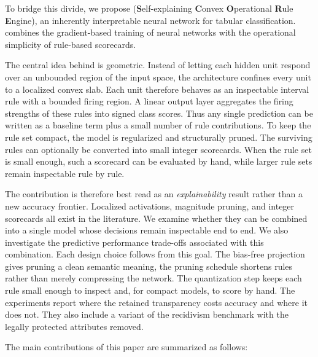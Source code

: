 To bridge this divide, we propose \modelname{} (\textbf{S}elf-explaining \textbf{C}onvex \textbf{O}perational \textbf{R}ule \textbf{E}ngine), an inherently interpretable neural network for tabular classification. \modelname{} combines the gradient-based training of neural networks with the operational simplicity of rule-based scorecards.


The central idea behind \modelname{} is geometric. Instead of letting each hidden
unit respond over an unbounded region of the input space, the architecture
confines every unit to a localized convex slab. Each unit therefore behaves as an
inspectable interval rule with a bounded firing region. A linear output layer
aggregates the firing strengths of these rules into signed class scores. Thus any
single prediction can be written as a baseline term plus a small number of rule
contributions. To keep the rule set compact, the model is regularized and structurally pruned. The surviving rules can optionally be converted into small integer scorecards. When the rule set is small enough, such a scorecard can be evaluated by hand, while larger rule sets remain inspectable rule by rule.

The contribution is therefore best read as an \emph{explainability} result rather
than a new accuracy frontier. Localized activations, magnitude pruning, and integer scorecards all exist in the literature. We examine whether they can be combined into a single model whose decisions remain inspectable end to end. We also investigate the predictive performance trade-offs associated with this combination. Each design
choice follows from this goal. The bias-free projection gives pruning a clean
semantic meaning, the pruning schedule shortens rules rather than merely
compressing the network. The quantization step keeps each rule small enough
to inspect and, for compact models, to score by hand. The experiments report
where the retained transparency costs accuracy and where it does not. They also include a
variant of the recidivism benchmark with the legally protected attributes
removed.

The main contributions of this paper are summarized as follows:

